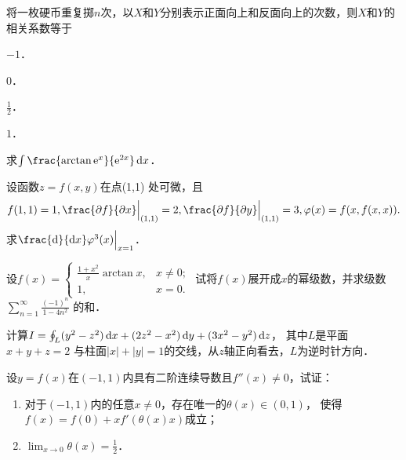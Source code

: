 \documentclass[plain,noanswer,medmath]{../../template/jnuexam}
\begin{document}
\begin{problem}
将一枚硬币重复掷$n$次，以$X$和$Y$分别表示正面向上和反面向上的次数，则$X$和$Y$的相关系数等于\pickout{}
\begin{abcd}
\item $- 1$．
\item $0$．
\item $\frac{1}{2}$．
\item $1$．
\end{abcd}
\end{problem}



\begin{problem}
求$\int \frac{\arctan \e^x}{\e^{2x}} \dx$．
\end{problem}



\begin{problem}
设函数$z = f(x,y)$在点(1,1) 处可微，且
$$f(1,1) = 1,\frac{\pdf}{\pdx}\Big|_{(1,1)} = 2,\frac{\pdf}{\pdy}\Big|_{(1,1)} = 3,\varphi(x) = f(x,f(x,x)).$$
求$\frac{\d}{\dx}\varphi^3(x)\Big|_{x = 1}$．
\end{problem}



\begin{problem}
设$f(x) = \begin{cases}
  \frac{1 + x^2}{x}\arctan x, & x \ne 0; \\
                           1, & x = 0.
\end{cases}$ 试将$f(x)$展开成$x$的幂级数，并求级数$\sum_{n = 1}^{\infty}\frac{(- 1)^n}{1 - 4n^2}$ 的和．
\end{problem}



\begin{problem}
计算$I = \oint_L (y^2 - z^2) \mathop{}\!\mathrm{d} x + (2z^2 - x^2)\mathop{}\!\mathrm{d} y + (3x^2 - y^2)\mathop{}\!\mathrm{d} z$，
其中$L$是平面$x + y + z = 2$ 与柱面$|x| + |y| = 1$的交线，从$z$轴正向看去，$L$为逆时针方向．
\end{problem}



\begin{problem}
设$y = f(x)$在$(- 1,1)$内具有二阶连续导数且$f''(x) \ne 0$，试证：
\begin{enumerate}
\item 对于$(- 1,1)$内的任意$x \ne 0$，存在唯一的$\theta (x) \in \left(0,1 \right)$，
      使得\goodbreak $f(x) = f(0) + xf'\left(\theta(x)x \right)$成立；
\item $\lim_{x \to 0} \theta(x) = \frac{1}{2}$．
\end{enumerate}
\end{problem}
\end{document}
